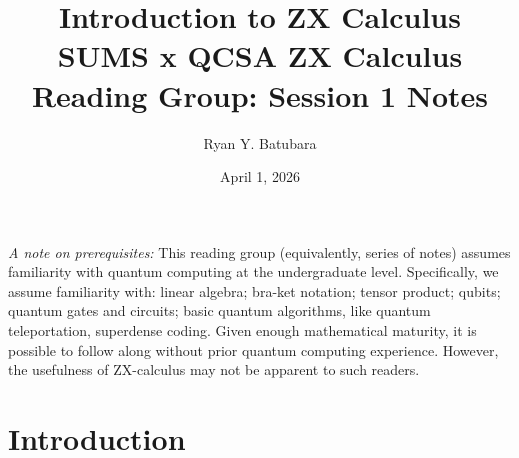\documentclass[11pt]{article}
\title{Introduction to ZX Calculus \\[0.5\baselineskip]
\large SUMS x QCSA ZX Calculus Reading Group: Session 1 Notes}
\author{Ryan Y. Batubara}
\date{April 1, 2026}
\begin{document}
\maketitle

\emph{A note on prerequisites:} This reading group (equivalently, series of notes) assumes familiarity with quantum computing at the undergraduate level. Specifically, we assume familiarity with: linear algebra; bra-ket notation; tensor product; qubits; quantum gates and circuits; basic quantum algorithms, like quantum teleportation, superdense coding. Given enough mathematical maturity, it is possible to follow along without prior quantum computing experience. However, the usefulness of ZX-calculus may not be apparent to such readers.

\section{Introduction}
\end{document}

